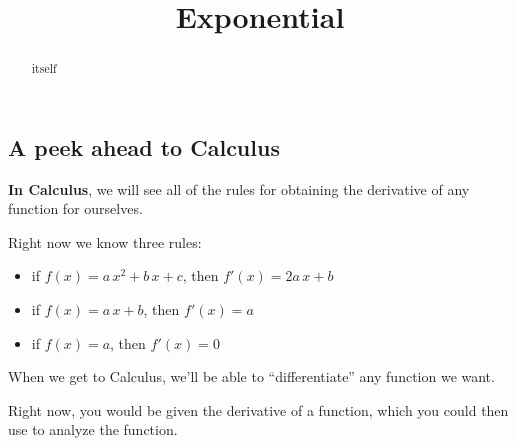 \documentclass{ximera}
\title{Exponential}
\begin{document}
\begin{abstract}
itself
\end{abstract}
\maketitle





\subsection*{A peek ahead to Calculus}



\textbf{\textcolor{blue!55!black}{In Calculus}}, we will see all of the rules for obtaining the derivative of any function for ourselves. 

Right now we know three rules:

\begin{itemize}
	\item if $f(x) = a \, x^2 + b \, x + c$, then $f'(x) = 2a \, x + b$
	\item if $f(x) = a \, x + b$, then $f'(x) = a$
	\item if $f(x) = a$, then $f'(x) = 0$
\end{itemize}



When we get to Calculus, we'll be able to ``differentiate'' any function we want. 

Right now, you would be given the derivative of a function, which you could then use to analyze the function. 
\end{document}
